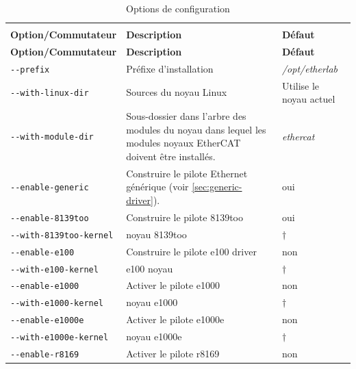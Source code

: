 \documentclass[a4paper,12pt,BCOR6mm,bibtotoc,idxtotoc]{scrbook}
\begin{document}
\begin{longtable}{l|p{}|l}
  \caption{Options de configuration}\rule[-5ex]{0mm}{0mm}
  \label{tab:config}\\

\textbf{Option/Commutateur} & \textbf{Description} &
\textbf{D\'efaut}\\\hline \endfirsthead

\textbf{Option/Commutateur} & \textbf{Description} &
\textbf{D\'efaut}\\\hline \endhead

\lstinline+--prefix+ & Pr\'efixe d'installation &
\textit{/opt/etherlab}\\

\lstinline+--with-linux-dir+ & Sources du noyau Linux & Utilise le
noyau actuel \\

\lstinline+--with-module-dir+ & Sous-dossier dans l'arbre des modules
du noyau dans lequel les modules noyaux EtherCAT doivent \^etre
install\'es.  & \textit{ethercat}\\

\hline

\lstinline+--enable-generic+ & Construire le pilote Ethernet
g\'en\'erique (voir \autoref{sec:generic-driver}). & oui\\

\lstinline+--enable-8139too+ & Construire le pilote 8139too & oui\\

\lstinline+--with-8139too-kernel+ & noyau 8139too & $\dagger$\\

\lstinline+--enable-e100+ & Construire le pilote e100 driver & non\\

\lstinline+--with-e100-kernel+ & e100 noyau & $\dagger$\\

\lstinline+--enable-e1000+ & Activer le pilote e1000 & non\\

\lstinline+--with-e1000-kernel+ & noyau e1000 & $\dagger$\\

\lstinline+--enable-e1000e+ & Activer le pilote e1000e & non\\

\lstinline+--with-e1000e-kernel+ & noyau e1000e & $\dagger$\\

\lstinline+--enable-r8169+ & Activer le pilote r8169 & non\\


\end{longtable}
\end{document}
